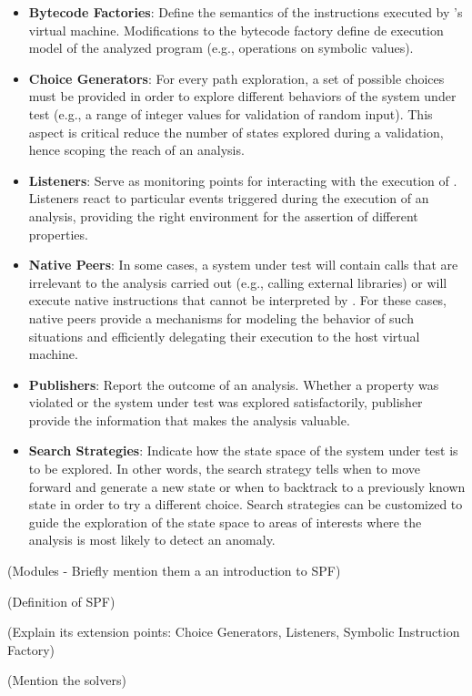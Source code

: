 \begin{itemize}
	\item \textbf{Bytecode Factories}: Define the semantics of the instructions executed by \jpf's virtual machine. Modifications to the bytecode factory define de execution model of the analyzed program (e.g., operations on symbolic values).
	
	\item \textbf{Choice Generators}: For every path exploration, a set of possible choices must be provided in order to explore different behaviors of the system under test (e.g., a range of integer values for validation of random input). This aspect is critical reduce the number of states explored during a validation, hence scoping the reach of an analysis.
	
	\item \textbf{Listeners}: Serve as monitoring points for interacting with the execution of \jpf. Listeners react to particular events triggered during the execution of an analysis, providing the right environment for the assertion of different properties.
	
	\item \textbf{Native Peers}: In some cases, a system under test will contain calls that are irrelevant to the analysis carried out (e.g., calling external libraries) or will execute native instructions that cannot be interpreted by \jpf. For these cases, native peers provide a mechanisms for modeling the behavior of such situations and efficiently delegating their execution to the host virtual machine.
	
	\item \textbf{Publishers}: Report the outcome of an analysis. Whether a property was violated or the system under test was explored satisfactorily, publisher provide the information that makes the analysis valuable.   
	
	\item \textbf{Search Strategies}: Indicate how the state space of the system under test is to be explored. In other words, the search strategy tells \jpf when to move forward and generate a new state or when to backtrack to a previously known state in order to try a different choice. Search strategies can be customized to guide the exploration of the state space to areas of interests where the analysis is most likely to detect an anomaly. 
\end{itemize}

(Modules - Briefly mention them a an introduction to SPF)

\label{subsec:spf}

(Definition of SPF)

(Explain its extension points: Choice Generators, Listeners, Symbolic Instruction Factory)

(Mention the solvers)







